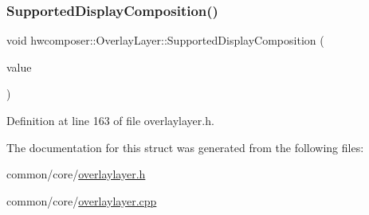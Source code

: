 \subsubsection{\texorpdfstring{Supported\+Display\+Composition()}{SupportedDisplayComposition()}}
{\footnotesize\ttfamily void hwcomposer\+::\+Overlay\+Layer\+::\+Supported\+Display\+Composition (\begin{DoxyParamCaption}\item[{\mbox{\hyperlink{structhwcomposer_1_1OverlayLayer_a937ae4fd43f1005ad8c0c89a9673f1e1}{Overlay\+Layer\+::\+Layer\+Composition}}}]{value }\end{DoxyParamCaption})\hspace{0.3cm}{\ttfamily [inline]}}



Definition at line 163 of file overlaylayer.\+h.


\begin{DoxyCode}{0}
\end{DoxyCode}


The documentation for this struct was generated from the following files\+:\begin{DoxyCompactItemize}
\item 
common/core/\mbox{\hyperlink{overlaylayer_8h}{overlaylayer.\+h}}\item 
common/core/\mbox{\hyperlink{overlaylayer_8cpp}{overlaylayer.\+cpp}}\end{DoxyCompactItemize}
